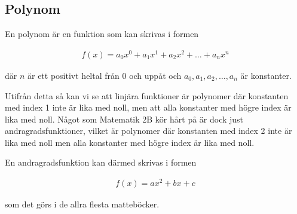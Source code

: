 \subsection{Polynom}

\begin{definition}
	En polynom är en funktion som kan skrivas i formen
	
	\begin{align}
		f(x) = a_0x^0 + a_1x^1 + a_2x^2 + \hdots + a_nx^n
	\end{align}
	
	där $n$ är ett positivt heltal från $0$ och uppåt och $a_0, a_1, a_2, \hdots, a_n$ är konstanter.
\end{definition}

Utifrån detta så kan vi se att linjära funktioner är polynomer där konstanten med index 1 inte är lika med noll, men att alla konstanter med högre index är lika med noll. Något som Matematik 2B kör hårt på är dock just andragradsfunktioner, vilket är polynomer där konstanten med index 2 inte är lika med noll men alla konstanter med högre index är lika med noll.

En andragradsfunktion kan därmed skrivas i formen

\begin{align}
	f(x) = ax^2 + bx + c
\end{align}

som det görs i de allra flesta matteböcker.






































































